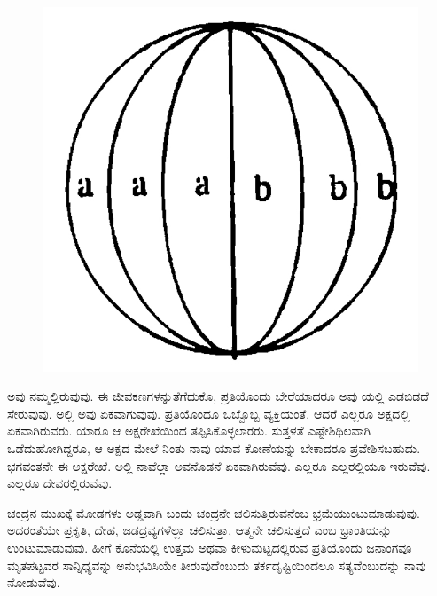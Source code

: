 \begin{figure}
  \centering
  \includegraphics{images/0002.jpg}
    \end{figure}
   

\noindent
ಅವು ನಮ್ಮಲ್ಲಿರುವುವು.  ಈ ಜೀವಕಣಗಳನ್ನು\break ತೆಗೆದುಕೊ, ಪ್ರತಿಯೊಂದು ಬೇರೆಯಾದರೂ ಅವು  ಯಲ್ಲಿ ಎಡಬಿಡದೆ ಸೇರುವುವು. ಅಲ್ಲಿ ಅವು ಏಕವಾಗುವುವು. ಪ್ರತಿಯೊಂದೂ ಒಬ್ಬೊಬ್ಬ ವ್ಯಕ್ತಿಯಂತೆ. ಆದರೆ ಎಲ್ಲರೂ  ಅಕ್ಷದಲ್ಲಿ ಏಕವಾಗಿರುವರು. ಯಾರೂ ಆ ಅಕ್ಷರೇಖೆಯಿಂದ ತಪ್ಪಿಸಿಕೊಳ್ಳಲಾರರು. ಸುತ್ತಳತೆ ಎಷ್ಟೇಶಿಥಿಲವಾಗಿ ಒಡೆದುಹೋಗಿದ್ದರೂ, ಆ ಅಕ್ಷದ ಮೇಲೆ ನಿಂತು ನಾವು ಯಾವ ಕೋಣೆಯನ್ನು ಬೇಕಾದರೂ ಪ್ರವೇಶಿಸಬಹುದು. ಭಗವಂತನೇ ಈ ಅಕ್ಷರೇಖೆ. ಅಲ್ಲಿ ನಾವೆಲ್ಲಾ ಅವನೊಡನೆ ಏಕವಾಗಿರುವೆವು. ಎಲ್ಲರೂ ಎಲ್ಲರಲ್ಲಿಯೂ ಇರುವೆವು. ಎಲ್ಲರೂ ದೇವರಲ್ಲಿರುವೆವು.

ಚಂದ್ರನ ಮುಖಕ್ಕೆ ಮೋಡಗಳು ಅಡ್ಡವಾಗಿ ಬಂದು ಚಂದ್ರನೇ ಚಲಿಸುತ್ತಿರುವನೆಂಬ ಭ್ರಮೆಯುಂಟುಮಾಡುವುವು. ಅದರಂತೆಯೇ ಪ್ರಕೃತಿ, ದೇಹ, ಜಡದ್ರವ್ಯಗಳೆಲ್ಲಾ ಚಲಿಸುತ್ತಾ, ಆತ್ಮನೇ ಚಲಿಸುತ್ತದೆ ಎಂಬ ಭ್ರಾಂತಿಯನ್ನು ಉಂಟುಮಾಡುವುವು. ಹೀಗೆ ಕೊನೆಯಲ್ಲಿ ಉತ್ತಮ ಅಥವಾ ಕೀಳುಮಟ್ಟದಲ್ಲಿರುವ ಪ್ರತಿಯೊಂದು ಜನಾಂಗವೂ ಮೃತಪಟ್ಟವರ ಸಾನ್ನಿಧ್ಯವನ್ನು ಅನುಭವಿಸಿಯೇ ತೀರುವುದೆಂಬುದು ತರ್ಕದೃಷ್ಟಿಯಿಂದಲೂ ಸತ್ಯವೆಂಬುದನ್ನು ನಾವು ನೋಡುವೆವು.

